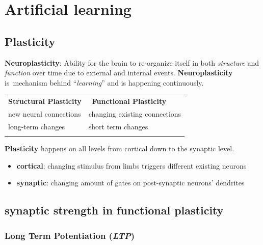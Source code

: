 \documentclass[
    fontsize      = 11pt,
    paper         = a4,
    twoside       = false,
    parskip       = half,
    pagesize      = false,
]{scrartcl}
\providecommand{\tightlist}{%
  \setlength{\itemsep}{0pt}\setlength{\parskip}{0pt}}
\begin{document}
\clearpage
\newpage

\hypertarget{artificial-learning}{%
\section{Artificial learning}\label{artificial-learning}}

\hypertarget{plasticity}{%
\subsection{Plasticity}\label{plasticity}}

\textbf{Neuroplasticity}: Ability for the brain to re-organize itself in
both \emph{structure} and \emph{function} over time due to external and
internal events. \textbf{Neuroplasticity} is~mechanism behind
``\emph{learning}'' and is happening continuously.

\begin{longtable}[]{@{}ll@{}}
\toprule
\textbf{Structural Plasticity} & ~\textbf{Functional
Plasticity} \\ \addlinespace
\midrule
\endhead
new neural connections & changing existing connections \\ \addlinespace
long-term changes & short term changes \\ \addlinespace
\bottomrule
\end{longtable}

\textbf{Plasticity} happens on all levels from cortical down to the
synaptic level.

\begin{itemize}
\tightlist
\item
  \textbf{cortical}: changing stimulus from limbs triggers different
  existing neurons
\item
  \textbf{synaptic}: changing amount of gates on post-synaptic neurons'
  dendrites
\end{itemize}

\hypertarget{synaptic-strength-in-functional-plasticity}{%
\subsection{\texorpdfstring{\textbf{synaptic strength} in functional
plasticity}{synaptic strength in functional plasticity}}\label{synaptic-strength-in-functional-plasticity}}

\hypertarget{long-term-potentiation-ltp}{%
\subsubsection{\texorpdfstring{Long Term Potentiation
(\emph{LTP})}{Long Term Potentiation (LTP)}}\label{long-term-potentiation-ltp}}
\end{document}
